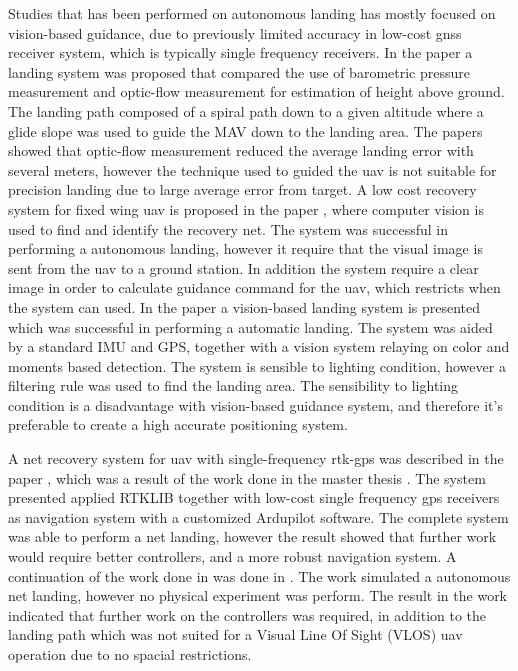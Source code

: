 Studies that has been performed on autonomous landing has mostly focused on vision-based guidance, due to previously limited accuracy in low-cost \gls{gnss} receiver system, which is typically single frequency receivers. In the paper \citep{barber2007autonomous} a landing system was proposed that compared the use of barometric pressure measurement and optic-flow measurement for estimation of height above ground. The landing path composed of a spiral path down to a given altitude where a glide slope was used to guide the MAV down to the landing area. The papers showed that optic-flow measurement reduced the average landing error with several meters, however the technique used to guided the \gls{uav} is not suitable for precision landing due to large average error from target. A low cost recovery system for fixed wing \gls{uav} is proposed in the paper \citep{kim2013fully}, where computer vision is used to find and identify the recovery net. The system was successful in performing a autonomous landing, however it require that the visual image is sent from the \gls{uav} to a ground station. In addition the system require a clear image in order to calculate guidance command for the \gls{uav}, which restricts when the system can used. In the paper \citep{huh2010vision} a vision-based landing system is presented which was successful in performing a automatic landing. The system was aided by a standard IMU and GPS, together with a vision system relaying on color and moments based detection. The system is sensible to lighting condition, however a filtering rule was used to find the landing area. The sensibility to lighting condition is a disadvantage with vision-based guidance system, and therefore it's preferable to create a high accurate positioning system.

A net recovery system for \gls{uav} with single-frequency \gls{rtk-gps} was described in the paper \citep{skulstad2015net}, which was a result of the work done in the master thesis \citep{Skulstad&Syversen}. The system presented applied RTKLIB together with low-cost single frequency \gls{gps} receivers as navigation system with a customized Ardupilot software. The complete system was able to perform a net landing, however the result showed that further work would require better controllers, and a more robust navigation system. A continuation of the work done in \citep{Skulstad&Syversen} was done in \citep{Froelich}. The work simulated a autonomous net landing, however no physical experiment was perform. The result in the work indicated that further work on the controllers was required, in addition to the landing path which was not suited for a Visual Line Of Sight  (VLOS) \gls{uav} operation due to no spacial restrictions.
